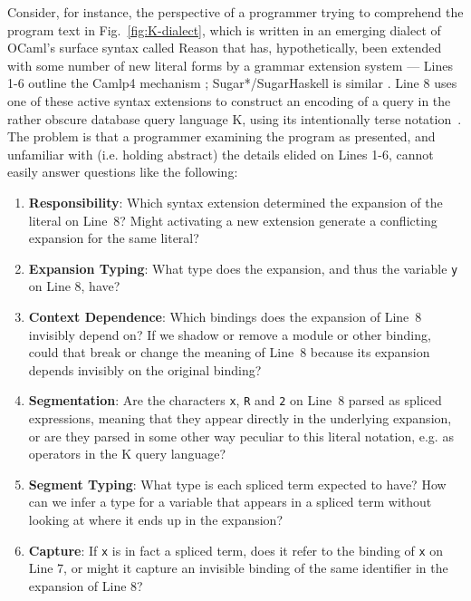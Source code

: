 \documentclass[acmsmall,screen]{acmart}
\newcommand{\li}[1]{\lstinline[basicstyle=\ttfamily\fontsize{9pt}{1em}\selectfont]{#1}}
\begin{document}
Consider, for instance, the perspective of a programmer trying to comprehend the program text in Fig.~\ref{fig:K-dialect}, which is written in an emerging dialect of OCaml's surface syntax called Reason \cite{reason-what} that has, hypothetically, been extended with some number of new literal forms by a grammar extension system --- Lines 1-6 outline the Camlp4 mechanism \cite{de2003camlp4}; Sugar*/SugarHaskell is similar \cite{erdweg2011sugarj,erdweg2012layout}. 
Line 8 uses one of these active syntax extensions to construct an encoding of a query in the rather obscure database query language K, using its intentionally terse notation~\cite{Whitney:2001:LOR:376284.375783}. The problem is that a programmer examining the program as presented, and unfamiliar with (i.e. holding abstract) the details elided on Lines 1-6, cannot easily answer questions like the following:

\begin{enumerate}[leftmargin=15px]
\item \textbf{Responsibility}: Which syntax extension determined the expansion of the literal on Line~8? Might activating a new extension generate a conflicting expansion for the same literal?
\item \textbf{Expansion Typing}: What type does the expansion, and thus the variable \li{y} on Line 8, have?
\item \textbf{Context Dependence}: Which bindings does the expansion of Line~8 invisibly depend on? If we shadow or remove a module or other binding, could that break or change the meaning of Line~8 because its expansion depends invisibly on the original binding?
\item \textbf{Segmentation}: Are the characters \li{x}, \li{R} and \li{2} on Line~8 parsed as spliced expressions, meaning that they appear directly in the underlying expansion, or are they parsed in some other way peculiar to this literal notation, e.g. as operators in the K query language?
\item \textbf{Segment Typing}: What type is each spliced term expected to have? How can we infer a type for a variable that appears in a spliced term without looking at where it ends up in the expansion?
\item \textbf{Capture}: If \li{x} is in fact a spliced term, does it refer to the binding of \li{x} on Line 7, or might it capture an invisible binding of the same identifier in the expansion of Line 8?
\end{enumerate}
\end{document}
